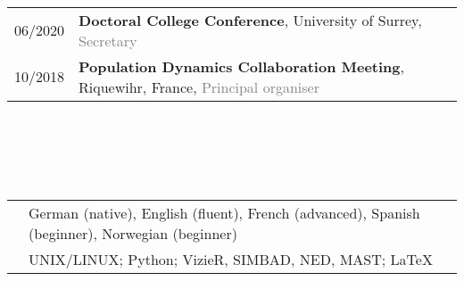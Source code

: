 \documentclass[a4paper,10pt,oneside]{article}
\begin{document}
\\
\\
 \smallskip \\
\noindent \begin{tabular}{@{}p{3.3cm}@{}@{}p{12.5cm}@{}}
06/2020& \textbf{Doctoral College Conference}, University of Surrey, \textcolor{gray}{Secretary}\\
10/2018& \textbf{Population Dynamics Collaboration Meeting}, Riquewihr, France, \textcolor{gray}{Principal organiser}\\
\end{tabular}\\
\\
\\
 \smallskip \\
\noindent \begin{tabular}{@{}p{3.3cm}@{}@{}p{12.5cm}@{}}
& German (native),  English (fluent),  French (advanced), Spanish (beginner), Norwegian (beginner)\smallskip\\
&  UNIX/LINUX; \quad Python; \quad VizieR, SIMBAD, NED, MAST; \quad\LaTeX  \\
\end{tabular}





\end{document}
